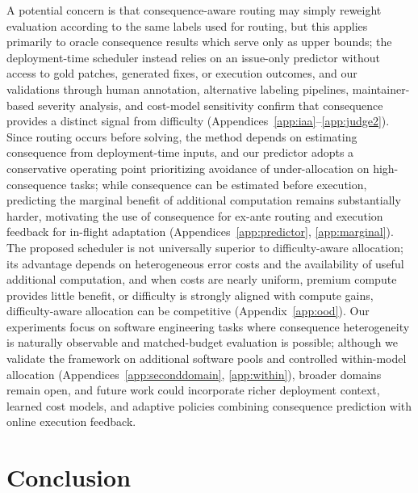 \documentclass{article}
\begin{document}
A potential concern is that consequence-aware routing may simply reweight evaluation according to the same labels used for routing, but this applies primarily to oracle consequence results which serve only as upper bounds; the deployment-time scheduler instead relies on an issue-only predictor without access to gold patches, generated fixes, or execution outcomes, and our validations through human annotation, alternative labeling pipelines, maintainer-based severity analysis, and cost-model sensitivity confirm that consequence provides a distinct signal from difficulty (Appendices~\ref{app:iaa}--\ref{app:judge2}). Since routing occurs before solving, the method depends on estimating consequence from deployment-time inputs, and our predictor adopts a conservative operating point prioritizing avoidance of under-allocation on high-consequence tasks; while consequence can be estimated before execution, predicting the marginal benefit of additional computation remains substantially harder, motivating the use of consequence for ex-ante routing and execution feedback for in-flight adaptation (Appendices~\ref{app:predictor}, \ref{app:marginal}). The proposed scheduler is not universally superior to difficulty-aware allocation; its advantage depends on heterogeneous error costs and the availability of useful additional computation, and when costs are nearly uniform, premium compute provides little benefit, or difficulty is strongly aligned with compute gains, difficulty-aware allocation can be competitive (Appendix~\ref{app:ood}). Our experiments focus on software engineering tasks where consequence heterogeneity is naturally observable and matched-budget evaluation is possible; although we validate the framework on additional software pools and controlled within-model allocation (Appendices~\ref{app:seconddomain}, \ref{app:within}), broader domains remain open, and future work could incorporate richer deployment context, learned cost models, and adaptive policies combining consequence prediction with online execution feedback.

\section{Conclusion}
\end{document}
